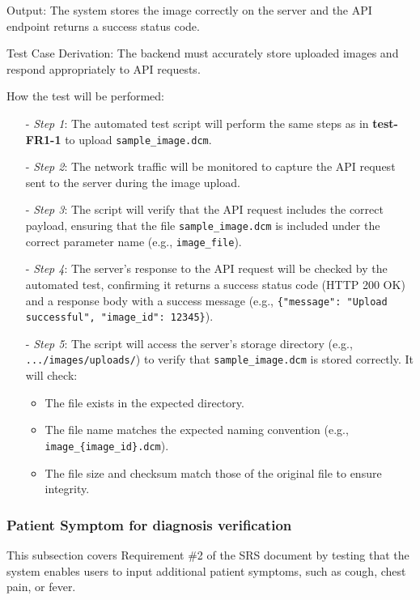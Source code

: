 \documentclass[12pt, titlepage]{article}
\begin{document}
\begin{enumerate}
Output: The system stores the image correctly on the server and the API endpoint returns a success status code.

Test Case Derivation: The backend must accurately store uploaded images and respond appropriately to API requests.

How the test will be performed: 
\begin{itemize}
  \item[-] \textit{Step 1}: The automated test script will perform the same steps as in \textbf{test-FR1-1} to upload \texttt{sample\_image.dcm}.
  \item[-] \textit{Step 2}: The network traffic will be monitored to capture the API request sent to the server during the image upload.
  \item[-] \textit{Step 3}: The script will verify that the API request includes the correct payload, ensuring that the file \texttt{sample\_image.dcm} is included under the correct parameter name (e.g., \texttt{image\_file}).
  \item[-] \textit{Step 4}: The server's response to the API request will be checked by the automated test, confirming it returns a success status code (HTTP 200 OK) and a response body with a success message (e.g., \texttt{\{"message": "Upload successful", "image\_id": 12345\}}).
  \item[-] \textit{Step 5}: The script will access the server's storage directory (e.g., \texttt{.../images/uploads/}) to verify that \texttt{sample\_image.dcm} is stored correctly. It will check:
    \begin{itemize}
      \item The file exists in the expected directory.
      \item The file name matches the expected naming convention (e.g., \texttt{image\_\{image\_id\}.dcm}).
      \item The file size and checksum match those of the original file to ensure integrity.
    \end{itemize}
  \end{itemize}
\end{enumerate}

\subsubsection{Patient Symptom for diagnosis verification }

This subsection covers Requirement \#2 of the SRS document by testing that the system enables users to input additional patient symptoms, such as cough, chest pain, or fever.
\end{document}
